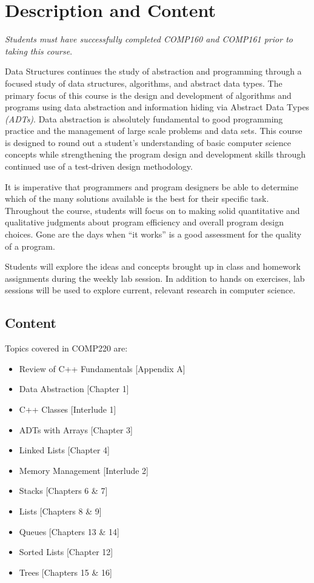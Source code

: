\documentclass[10pt]{article}
\begin{document}
\section{Description and Content}

\emph{Students must have successfully completed COMP160 and COMP161 prior to taking this course}.

Data Structures continues the study of abstraction and programming through a focused study of data structures, algorithms, and abstract data types.  The primary focus of this course is the design and development of algorithms and programs using data abstraction and information hiding via Abstract Data Types \textit{(ADTs)}.  Data abstraction is absolutely fundamental to good programming practice and the management of large scale problems and data sets.  This course is designed to round out a student's understanding of basic computer science concepts while strengthening the program design and development skills through continued use of a test-driven design methodology.

It is imperative that programmers and program designers be able to determine which of the many solutions available is the best for their specific task.  Throughout the course, students will focus on to making solid quantitative and qualitative judgments about program efficiency and overall program design choices.  Gone are the days when ``it works'' is a good assessment for the quality of a program.

Students will explore the ideas and concepts brought up in class and homework assignments during the weekly lab session.  In addition to hands on exercises, lab sessions will be used to explore current, relevant research in computer science.

\subsection{Content}

Topics covered in COMP220 are:
\begin{itemize}
\item Review of C++ Fundamentals [Appendix A]
\item Data Abstraction [Chapter 1]
\item C++ Classes [Interlude 1]
\item ADTs with Arrays [Chapter 3]
\item Linked Lists [Chapter 4]
\item Memory Management [Interlude 2]
\item Stacks [Chapters 6 \& 7]
\item Lists [Chapters 8 \& 9]
\item Queues [Chapters 13 \& 14]
\item Sorted Lists [Chapter 12]
\item Trees [Chapters 15 \& 16]
\end{itemize}
   
\end{document}
